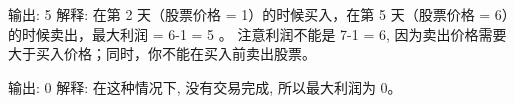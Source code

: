 输出: 5
解释: 在第 2 天（股票价格 = 1）的时候买入，在第 5 天（股票价格 = 6）的时候卖出，最大利润 = 6-1 = 5 。
     注意利润不能是 7-1 = 6, 因为卖出价格需要大于买入价格；同时，你不能在买入前卖出股票。

输出: 0
解释: 在这种情况下, 没有交易完成, 所以最大利润为 0。
